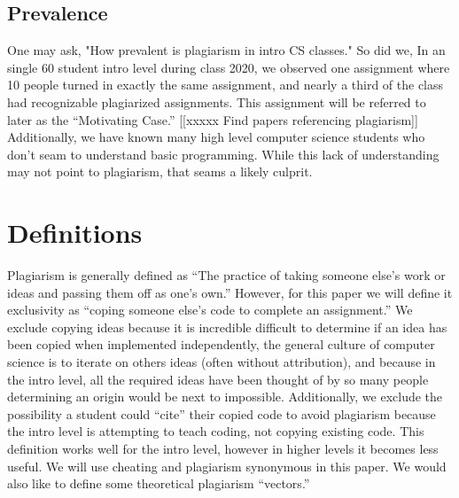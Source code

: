 \documentclass[conference]{IEEEtran}
\newcommand{\n}{\hfill\break}
\begin{document}
		\subsection{Prevalence}
		 One may ask, "How prevalent is plagiarism in intro CS classes." So did we, In an single 60 student intro level during class 2020, we observed one assignment where 10 people turned in exactly the same assignment, and nearly a third of the class had recognizable plagiarized assignments.   This assignment will be referred to later as the ``Motivating Case.''
		 [[xxxxx Find papers referencing plagiarism]]
		 Additionally, we have known many high level computer science students who don't seam to understand basic programming.  While this lack of understanding may not point to plagiarism, that seams a likely culprit.
		
\n\section{\textbf{Definitions}}
Plagiarism is generally defined as ``The practice of taking someone else's work or ideas and passing them off as one's own.''\cite{oxed}  However, for this paper we will define it exclusivity as ``coping someone else's code to complete an assignment.''  We exclude copying ideas because it is incredible difficult to determine if an idea has been copied when implemented independently, the general culture of computer science is to iterate on others ideas (often without attribution), and because in the intro level, all the required ideas have been thought of by so many people determining an origin would be next to impossible.  Additionally, we exclude the possibility a student could ``cite'' their copied code to avoid plagiarism because the intro level is attempting to teach coding, not copying existing code.  This definition works well for the intro level, however in higher levels it becomes less useful.  We will use cheating and plagiarism synonymous in this paper.  We would also like to define some theoretical plagiarism ``vectors.''
\end{document}
